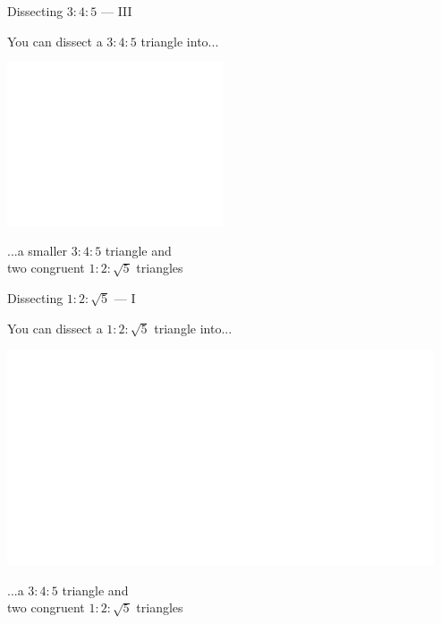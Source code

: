\documentclass[14pt]{beamer}
\begin{document}

    \begin{frame}{Dissecting $3\!\!:\!\!4\!\!:\!\!5$ --- III}
        \begin{center}
            You can dissect a $3\!\!:\!\!4\!\!:\!\!5$ triangle into...

            \bigskip \bigskip

            \includegraphics[height=18ex]{figures/figure006d.pdf}

            \bigskip \bigskip

            ...a smaller $3\!\!:\!\!4\!\!:\!\!5$ triangle and\\two congruent $1\!\!:\!\!2\!\!:\!\!\sqrt{5}$ triangles
        \end{center}
    \end{frame}


    \begin{frame}{Dissecting $1\!\!:\!\!2\!\!:\!\!\sqrt{5}$ --- I}
        \begin{center}
            You can dissect a $1\!\!:\!\!2\!\!:\!\!\sqrt{5}$ triangle into...

            \bigskip \bigskip

            \includegraphics[height=18ex]{figures/figure006e.pdf}

            \bigskip \bigskip

            ...a $3\!\!:\!\!4\!\!:\!\!5$ triangle and\\two congruent $1\!\!:\!\!2\!\!:\!\!\sqrt{5}$ triangles
        \end{center}
    \end{frame}
\end{document}
